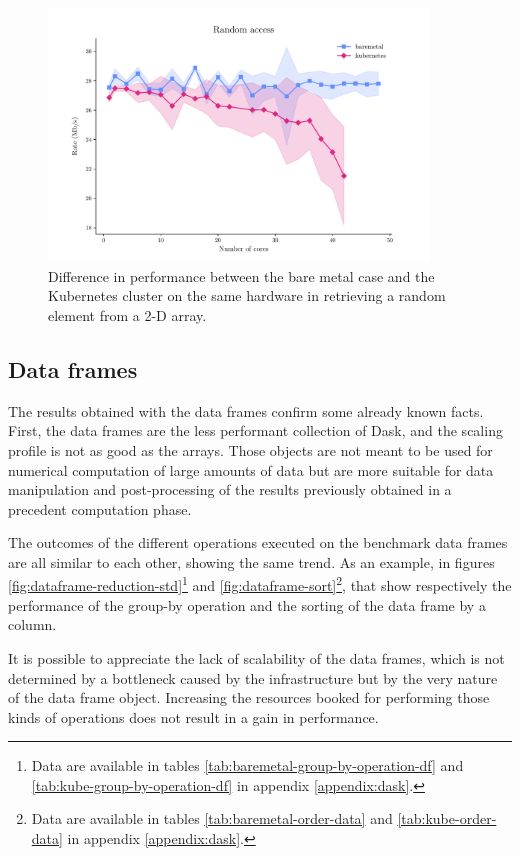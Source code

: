 \begin{figure}
  \centering
  \includegraphics[width=0.9\textwidth]{img/chpt4/array-random-access}
  \caption{Difference in performance between the bare metal case and the
    Kubernetes cluster on the same hardware in retrieving a random element from
    a 2-D array.}
  \label{fig:array-random-access}
\end{figure}

\subsection{Data frames}

The results obtained with the data frames confirm some already known facts.
First, the data frames are the less performant collection of Dask, and the
scaling profile is not as good as the arrays.
Those objects are not meant to be used for numerical computation of large
amounts of data but are more suitable for data manipulation and post-processing
of the results previously obtained in a precedent computation phase.

The outcomes of the different operations executed on the benchmark data frames
are all similar to each other, showing the same trend.
As an example, in figures \ref{fig:dataframe-reduction-std}\footnote{
  Data are available in tables \ref{tab:baremetal-group-by-operation-df} and
  \ref{tab:kube-group-by-operation-df} in appendix \ref{appendix:dask}.
} and \ref{fig:dataframe-sort}\footnote{
  Data are available in tables \ref{tab:baremetal-order-data} and
  \ref{tab:kube-order-data} in appendix \ref{appendix:dask}.
}, that show respectively the performance of the group-by operation and the
sorting of the data frame by a column.

It is possible to appreciate the lack of scalability of the data frames, which
is not determined by a bottleneck caused by the infrastructure but by the very
nature of the data frame object. Increasing the resources booked for performing
those kinds of operations does not result in a gain in performance.

